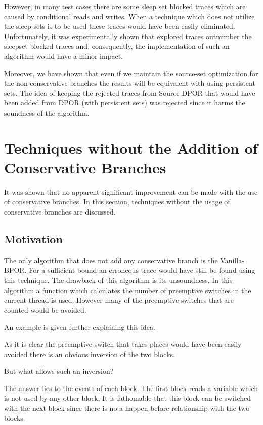 However, in many test cases there are some sleep set blocked traces which are caused by conditional reads and writes. When a technique which does not utilize 
the sleep sets is to be used these traces would have been easily eliminated. Unfortunately, it was experimentally shown that explored traces outnumber the sleepset blocked
traces and, consequently, the implementation of such an algorithm would have a minor impact.

Moreover, we have shown that even if we maintain the source-set optimization for the non-conservative branches the results will be equivalent with using
persistent sets. 
The idea of keeping the rejected traces from Source-DPOR that would have been added from DPOR (with persistent sets) was rejected since it harms
the soundness of the algorithm.

\section{Techniques without the Addition of Conservative Branches}

It was shown that no apparent significant improvement can be made with the use of conservative branches. In this section, techniques without the usage of 
conservative branches are discussed.

\subsection{Motivation}
The only algorithm that does not add any conservative branch is the Vanilla-BPOR. For a sufficient bound an erroneous trace would have still be found using this technique.
The drawback of this algorithm is its unsoundness. In this algorithm a function which calculates the number of preemptive switches in the current thread is used.
However many of the preemptive switches that are counted would be avoided.

An example is given further explaining this idea.


As it is clear the preemptive switch that takes places would have been easily avoided there is an obvious inversion of the two blocks.

But what allows such an inversion?

The answer lies to the events of each block. The first block reads a variable which is not used by any other block. It is fathomable that this block can be switched with the
next block since there is no a happen before relationship with the two blocks.

